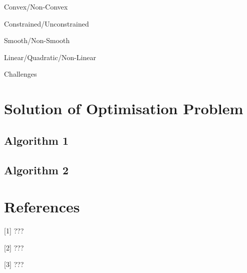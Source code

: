 \documentclass[10pt, a4paper]{amsart}
\begin{document}
Convex/Non-Convex

Constrained/Unconstrained

Smooth/Non-Smooth

Linear/Quadratic/Non-Linear

Challenges


\section{Solution of Optimisation Problem}

\subsection{Algorithm 1}\hfill

\subsection{Algorithm 2}\hfill


\section{References}

[1] ???

[2] ???

[3] ???
\end{document}
